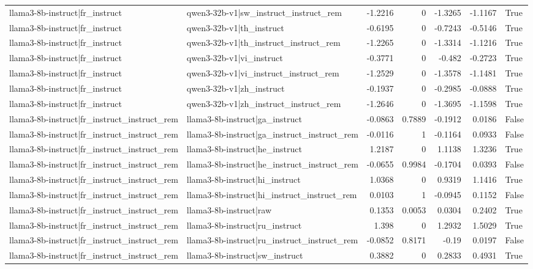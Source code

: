 \begin{table}
\begin{tabular}{l l r r r r l}
llama3-8b-instruct|fr_instruct & qwen3-32b-v1|sw_instruct_instruct_rem & -1.2216 & 0 & -1.3265 & -1.1167 & True \\
llama3-8b-instruct|fr_instruct & qwen3-32b-v1|th_instruct & -0.6195 & 0 & -0.7243 & -0.5146 & True \\
llama3-8b-instruct|fr_instruct & qwen3-32b-v1|th_instruct_instruct_rem & -1.2265 & 0 & -1.3314 & -1.1216 & True \\
llama3-8b-instruct|fr_instruct & qwen3-32b-v1|vi_instruct & -0.3771 & 0 & -0.482 & -0.2723 & True \\
llama3-8b-instruct|fr_instruct & qwen3-32b-v1|vi_instruct_instruct_rem & -1.2529 & 0 & -1.3578 & -1.1481 & True \\
llama3-8b-instruct|fr_instruct & qwen3-32b-v1|zh_instruct & -0.1937 & 0 & -0.2985 & -0.0888 & True \\
llama3-8b-instruct|fr_instruct & qwen3-32b-v1|zh_instruct_instruct_rem & -1.2646 & 0 & -1.3695 & -1.1598 & True \\
llama3-8b-instruct|fr_instruct_instruct_rem & llama3-8b-instruct|ga_instruct & -0.0863 & 0.7889 & -0.1912 & 0.0186 & False \\
llama3-8b-instruct|fr_instruct_instruct_rem & llama3-8b-instruct|ga_instruct_instruct_rem & -0.0116 & 1 & -0.1164 & 0.0933 & False \\
llama3-8b-instruct|fr_instruct_instruct_rem & llama3-8b-instruct|he_instruct & 1.2187 & 0 & 1.1138 & 1.3236 & True \\
llama3-8b-instruct|fr_instruct_instruct_rem & llama3-8b-instruct|he_instruct_instruct_rem & -0.0655 & 0.9984 & -0.1704 & 0.0393 & False \\
llama3-8b-instruct|fr_instruct_instruct_rem & llama3-8b-instruct|hi_instruct & 1.0368 & 0 & 0.9319 & 1.1416 & True \\
llama3-8b-instruct|fr_instruct_instruct_rem & llama3-8b-instruct|hi_instruct_instruct_rem & 0.0103 & 1 & -0.0945 & 0.1152 & False \\
llama3-8b-instruct|fr_instruct_instruct_rem & llama3-8b-instruct|raw & 0.1353 & 0.0053 & 0.0304 & 0.2402 & True \\
llama3-8b-instruct|fr_instruct_instruct_rem & llama3-8b-instruct|ru_instruct & 1.398 & 0 & 1.2932 & 1.5029 & True \\
llama3-8b-instruct|fr_instruct_instruct_rem & llama3-8b-instruct|ru_instruct_instruct_rem & -0.0852 & 0.8171 & -0.19 & 0.0197 & False \\
llama3-8b-instruct|fr_instruct_instruct_rem & llama3-8b-instruct|sw_instruct & 0.3882 & 0 & 0.2833 & 0.4931 & True \\

\end{tabular}
\end{table}

